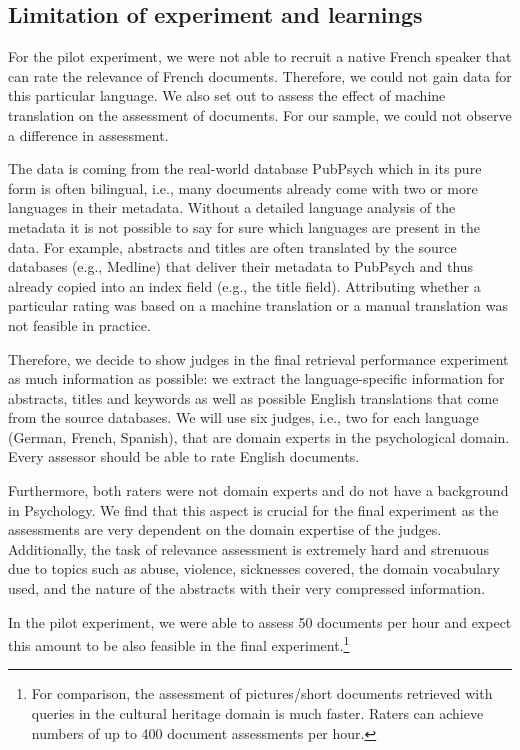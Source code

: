 \documentclass[a4paper,11pt]{article}
\begin{document}
\subsection{Limitation of experiment and learnings}
For the pilot experiment, we were not able to recruit a native French speaker that can rate the relevance of French documents. Therefore, we could not gain data for this particular language. We also set out to assess the effect of machine translation on the assessment of documents. For our sample, we could not observe a difference in assessment. 

The data is coming from the real-world database PubPsych which in its pure form is often bilingual, i.e., many documents already come with two or more languages in their metadata. Without a detailed language analysis of the metadata it is not possible to say for sure which languages are present in the data. For example, abstracts and titles are often translated by the source databases (e.g., Medline) that deliver their metadata to PubPsych and thus already copied into an index field (e.g., the title field). Attributing whether a particular rating was based on a machine translation or a manual translation was not feasible in practice. 

Therefore, we decide to show judges in the final retrieval performance experiment as much information as possible: we extract the language-specific information for abstracts, titles and keywords as well as possible English translations that come from the source databases. We will use six judges, i.e., two for each language (German, French, Spanish), that are domain experts in the psychological domain. Every assessor should be able to rate English documents.

Furthermore, both raters were not domain experts and do not have a background in Psychology. We find that this aspect is crucial for the final experiment as the assessments are very dependent on the domain expertise of the judges. Additionally, the task of relevance assessment is extremely hard and strenuous due to topics such as abuse, violence, sicknesses covered, the domain vocabulary used, and the nature of the abstracts with their very compressed information. 

In  the pilot experiment, we were able to assess 50 documents per hour and expect this amount to be also feasible in the final experiment.\footnote{For comparison, the assessment of pictures/short documents retrieved with queries in the cultural heritage domain is much faster. Raters can achieve numbers of up to 400 document assessments per hour.}
\end{document}
